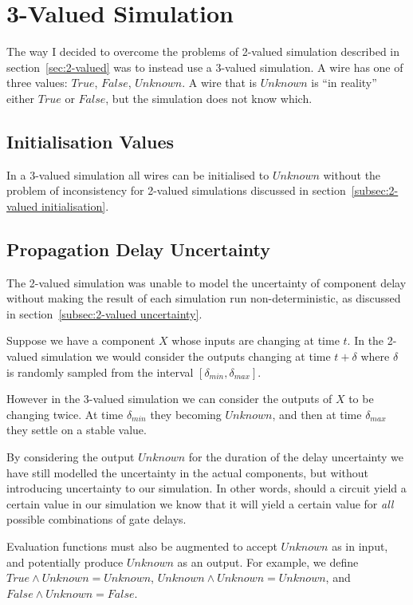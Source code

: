 \section{3-Valued Simulation}
\label{sec:3-valued}
The way I decided to overcome the problems of 2-valued simulation described in section~\ref{sec:2-valued} was to instead use a 3-valued simulation. A wire has one of three values: $True$, $False$, $Unknown$. A wire that is $Unknown$ is ``in reality'' either $True$ or $False$, but the simulation does not know which.

\subsection{Initialisation Values}
In a 3-valued simulation all wires can be initialised to $Unknown$ without the problem of inconsistency for 2-valued simulations discussed in section~\ref{subsec:2-valued initialisation}.

\subsection{Propagation Delay Uncertainty}
\label{subsec:3-valued uncertainty}
The 2-valued simulation was unable to model the uncertainty of component delay without making the result of each simulation run non-deterministic, as discussed in section~\ref{subsec:2-valued uncertainty}.

Suppose we have a component $X$ whose inputs are changing at time $t$. In the 2-valued simulation we would consider the outputs changing at time $t + \delta$ where $\delta$ is randomly sampled from the interval $[\delta_{min}, \delta_{max}]$. 

However in the 3-valued simulation we can consider the outputs of $X$ to be changing twice. At time $\delta_{min}$ they becoming $Unknown$, and then at time $\delta_{max}$ they settle on a stable value. 

By considering the output $Unknown$ for the duration of the delay uncertainty we have still modelled the uncertainty in the actual components, but without introducing uncertainty to our simulation. In other words, should a circuit yield a certain value in our simulation we know that it will yield a certain value for \textit{all} possible combinations of gate delays.

Evaluation functions must also be augmented to accept $Unknown$ as in input, and potentially produce $Unknown$ as an output. For example, we define $True \land Unknown = Unknown$, $Unknown \land Unknown = Unknown$, and $False \land Unknown = False$.

